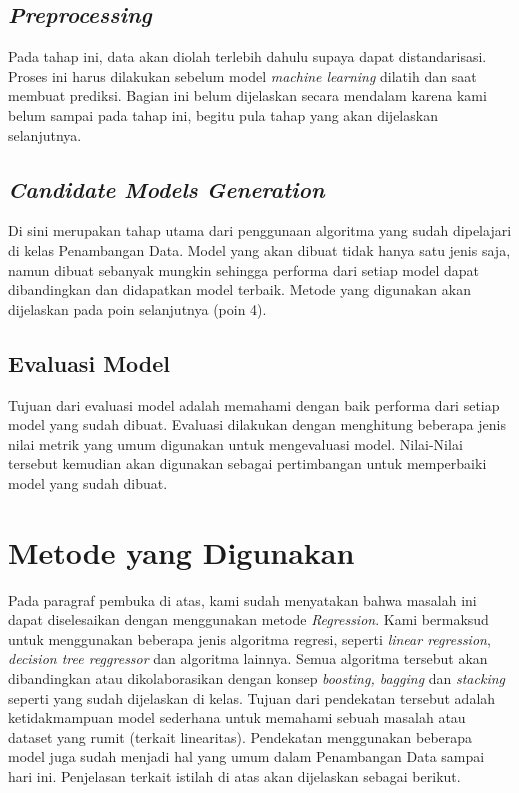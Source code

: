 \documentclass{article}
\begin{document}
\begin{normalsize}
        \subsection{\textit{Preprocessing}}
        Pada tahap ini, data akan diolah terlebih dahulu supaya dapat distandarisasi. Proses ini harus dilakukan
        sebelum model \textit{machine learning} dilatih dan saat membuat prediksi. Bagian ini belum dijelaskan
        secara mendalam karena kami belum sampai pada tahap ini, begitu pula tahap yang akan dijelaskan selanjutnya.

        \subsection{\textit{Candidate Models Generation}}
        Di sini merupakan tahap utama dari penggunaan algoritma yang sudah dipelajari di kelas Penambangan Data.
        Model yang akan dibuat tidak hanya satu jenis saja, namun dibuat sebanyak mungkin sehingga performa dari
        setiap model dapat dibandingkan dan didapatkan model terbaik. Metode yang digunakan akan dijelaskan pada
        poin selanjutnya (poin 4).

        \subsection{Evaluasi Model}
        Tujuan dari evaluasi model adalah memahami dengan baik performa dari setiap model yang sudah dibuat.
        Evaluasi dilakukan dengan menghitung beberapa jenis nilai metrik yang umum digunakan untuk mengevaluasi
        model. Nilai-Nilai tersebut kemudian akan digunakan sebagai pertimbangan untuk memperbaiki model yang
        sudah dibuat.

        \section{Metode yang Digunakan}

        Pada paragraf pembuka di atas, kami sudah menyatakan bahwa masalah ini dapat diselesaikan dengan menggunakan
        metode \textit{Regression}. Kami bermaksud untuk menggunakan beberapa jenis algoritma regresi, seperti
        \textit{linear regression}, \textit{decision tree reggressor} dan algoritma lainnya. Semua algoritma 
        tersebut akan dibandingkan atau dikolaborasikan dengan konsep \textit{boosting, bagging} dan 
        \textit{stacking} seperti yang sudah dijelaskan di kelas. Tujuan dari pendekatan tersebut adalah ketidakmampuan
        model sederhana untuk memahami sebuah masalah atau dataset yang rumit (terkait linearitas). Pendekatan 
        menggunakan beberapa model juga sudah menjadi hal yang umum dalam Penambangan Data sampai hari ini.
        Penjelasan terkait istilah di atas akan dijelaskan sebagai berikut.


\end{normalsize}
\end{document}
